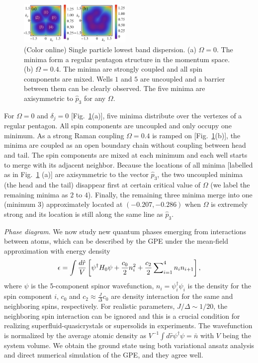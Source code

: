 \documentclass[twocolumn,prl,floatfix,citeautoscript,nofootinbib]{revtex4}
\begin{document}
\begin{figure}[t]
\centering
\includegraphics[width=0.48\textwidth]{Fig2.pdf}
\caption{(Color online) Single particle lowest band dispersion. (a) $\Omega
=0$. The minima form a regular pentagon structure in the momentum space. (b)
$\Omega =0.4$. The minima are strongly coupled and all spin components are
mixed. Wells $1$ and $5$ are uncoupled and a barrier between them can be
clearly observed. The five minima are axisymmetric to $\hat{p}_{3}$ for any $%
\Omega $.}
\label{fig2}
\end{figure}

For $\Omega =0$ and $\delta _{j}=0$ [Fig.~\ref{fig2}(a)], five minima
distribute over the vertexes of a regular pentagon. All spin components are
uncoupled and only occupy one minimum. As a strong Raman coupling $\Omega
=0.4$ is ramped on [Fig.~\ref{fig2}(b)], the minima are coupled as an open
boundary chain without coupling between head and tail. The spin components
are mixed at each minimum and each well starts to merge with its adjacent
neighbor. Because the locations of all minima [labelled as in Fig.~\ref{fig2}%
(a)] are axisymmetric to the vector $\hat{p}_{3}$, the two uncoupled minima
(the head and the tail) disappear first at certain critical value of $\Omega
$ (we label the remaining minima as $2$ to $4$). Finally, the remaining
three minima merge into one (minimum $3$) approximately located at $%
(-0.207,-0.286)$ \cite{MyApp} when $\Omega $ is extremely strong and its
location is still along the same line as $\hat{p}_{3}$.

\emph{Phase diagram}. We now study new quantum phases emerging from
interactions between atoms, which can be described by the GPE under the
mean-field approximation with energy density
\begin{equation}
\epsilon =\int \frac{d\hat{r}}{V}\left[ \psi ^{\dagger }H_{0}\psi +\frac{%
c_{0}}{2}n_{i}^{2}+\frac{c_{2}}{2}\sum\nolimits_{i=1}^{4}n_{i}n_{i+1}\right]
,
\end{equation}%
where $\psi $ is the 5-component spinor wavefunction, $n_{i}=\psi
_{i}^{\dagger}\psi _{i}$ is the density for the spin component $i$, $c_{0}$
and $c_{2}\approx \frac{J}{\Delta }c_{0}$ are density interaction for the
same and neighboring spins, respectively. For realistic parameters, $%
J/\Delta \sim 1/20$, the neighboring spin interaction can be ignored \cite%
{Li2017} and this is a crucial condition for realizing
superfluid-quasicrystals or supersolids in experiments. The wavefunction is
normalized by the average atomic density as $V^{-1}\int d\hat{r}\psi
^{\dagger }\psi =\bar{n}$ with $V$ being the system volume. We obtain the
ground state using both variational ansatz analysis and direct numerical
simulation of the GPE, and they agree well.
\end{document}
